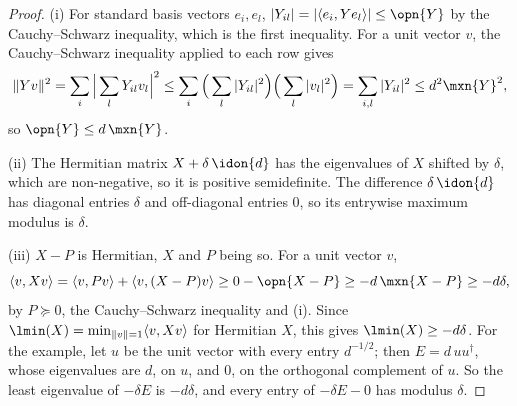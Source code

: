 \begin{proof}
(i) For standard basis vectors $e_i,e_l$,
$|Y_{il}|=|\langle e_i,Ye_l\rangle|\le\opn{Y}$ by the Cauchy--Schwarz
inequality, which is the first inequality. For a unit vector $v$, the
Cauchy--Schwarz inequality applied to each row gives
\begin{equation*}
  \|Yv\|^{2}=\sum_i\Big|\sum_lY_{il}v_l\Big|^{2}
  \le\sum_i\Big(\sum_l|Y_{il}|^{2}\Big)\Big(\sum_l|v_l|^{2}\Big)
  =\sum_{i,l}|Y_{il}|^{2}\le d^{2}\mxn{Y}^{2},
\end{equation*}
so $\opn{Y}\le d\,\mxn{Y}$.

(ii) The Hermitian matrix $X+\delta\,\idon{d}$ has the eigenvalues of $X$
shifted by $\delta$, which are non-negative, so it is positive semidefinite.
The difference $\delta\,\idon{d}$ has diagonal entries $\delta$ and
off-diagonal entries $0$, so its entrywise maximum modulus is $\delta$.

(iii) $X-P$ is Hermitian, $X$ and $P$ being so. For a unit vector $v$,
\begin{equation*}
  \langle v,Xv\rangle=\langle v,Pv\rangle+\langle v,(X-P)v\rangle
  \ge0-\opn{X-P}\ge-d\,\mxn{X-P}\ge-d\delta,
\end{equation*}
by $P\succeq0$, the Cauchy--Schwarz inequality and (i). Since
$\lmin(X)=\min_{\|v\|=1}\langle v,Xv\rangle$ for Hermitian $X$, this gives
$\lmin(X)\ge-d\delta$. For the example, let $u$ be the unit vector with every
entry $d^{-1/2}$; then $E=d\,uu^{\dagger}$, whose eigenvalues are $d$, on $u$,
and $0$, on the orthogonal complement of $u$. So the least eigenvalue of
$-\delta E$ is $-d\delta$, and every entry of $-\delta E-0$ has modulus
$\delta$.
\end{proof}
